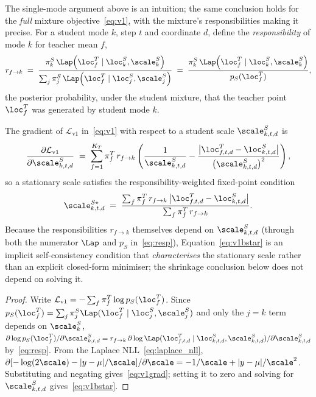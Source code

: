 The single-mode argument above is an intuition; the same conclusion holds for the
\emph{full} mixture objective~\eqref{eq:v1}, with the mixture's responsibilities
making it precise. For a student mode $k$, step $t$ and coordinate $d$, define the
\emph{responsibility} of mode $k$ for teacher mean $f$,
\begin{equation}
  \label{eq:resp}
  r_{f\to k}
    \;=\; \frac{\pi^S_k\,\Lap\!\left(\loc^T_f\mid\loc^S_k,\scale^S_k\right)}
               {\sum_{j}\pi^S_j\,\Lap\!\left(\loc^T_f\mid\loc^S_j,\scale^S_j\right)}
    \;=\; \frac{\pi^S_k\,\Lap\!\left(\loc^T_f\mid\loc^S_k,\scale^S_k\right)}{p_S(\loc^T_f)},
\end{equation}
the posterior probability, under the student mixture, that the teacher point
$\loc^T_f$ was generated by student mode $k$.
\begin{prop}
\label{prop:v1grad}
The gradient of $\mathcal{L}_{\mathrm{v1}}$ in~\eqref{eq:v1} with respect to a
student scale $\scale^S_{k,t,d}$ is
\begin{equation}
  \label{eq:v1grad}
  \frac{\partial \mathcal{L}_{\mathrm{v1}}}{\partial \scale^S_{k,t,d}}
    \;=\; \sum_{f=1}^{K_T} \pi^T_f\, r_{f\to k}
      \left(\frac{1}{\scale^S_{k,t,d}}
            - \frac{\bigl\lvert \loc^T_{f,t,d}-\loc^S_{k,t,d}\bigr\rvert}
                   {\bigl(\scale^S_{k,t,d}\bigr)^2}\right),
\end{equation}
so a stationary scale satisfies the responsibility-weighted fixed-point condition
\begin{equation}
  \label{eq:v1bstar}
  \scale^{S\star}_{k,t,d}
    \;=\; \frac{\sum_f \pi^T_f\, r_{f\to k}\,
                \bigl\lvert \loc^T_{f,t,d}-\loc^S_{k,t,d}\bigr\rvert}
               {\sum_f \pi^T_f\, r_{f\to k}} .
\end{equation}
Because the responsibilities $r_{f\to k}$ themselves depend on
$\scale^S_{k,t,d}$ (through both the numerator $\Lap$ and $p_S$ in~\eqref{eq:resp}),
Equation~\eqref{eq:v1bstar} is an implicit self-consistency condition that
\emph{characterises} the stationary scale rather than an explicit closed-form
minimiser; the shrinkage conclusion below does not depend on solving it.
\end{prop}
\begin{proof}
Write $\mathcal{L}_{\mathrm{v1}}=-\sum_f \pi^T_f \log p_S(\loc^T_f)$. Since
$p_S(\loc^T_f)=\sum_j \pi^S_j\Lap(\loc^T_f\mid\loc^S_j,\scale^S_j)$ and only the
$j{=}k$ term depends on $\scale^S_{k}$,
$\partial \log p_S(\loc^T_f)/\partial \scale^S_{k,t,d}
 = r_{f\to k}\,\partial \log\Lap(\loc^T_{f,t,d}\mid\loc^S_{k,t,d},\scale^S_{k,t,d})/\partial\scale^S_{k,t,d}$
by~\eqref{eq:resp}. From the Laplace NLL~\eqref{eq:laplace_nll},
$\partial[-\log(2\scale)-|y-\mu|/\scale]/\partial\scale = -1/\scale + |y-\mu|/\scale^2$.
Substituting and negating gives~\eqref{eq:v1grad}; setting it to zero and solving
for $\scale^S_{k,t,d}$ gives~\eqref{eq:v1bstar}.
\end{proof}
